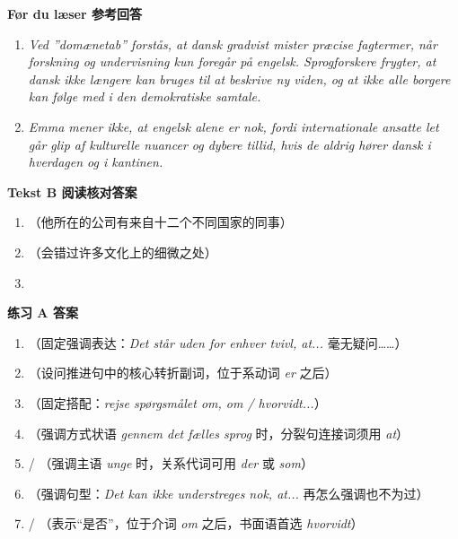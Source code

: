 \begin{answerbox}
\textbf{Før du læser 参考回答}
\begin{enumerate}
  \item \textit{Ved ”domænetab” forstås, at dansk gradvist mister præcise fagtermer, når forskning og undervisning kun foregår på engelsk. Sprogforskere frygter, at dansk ikke længere kan bruges til at beskrive ny viden, og at ikke alle borgere kan følge med i den demokratiske samtale.}
  \item \textit{Emma mener ikke, at engelsk alene er nok, fordi internationale ansatte let går glip af kulturelle nuancer og dybere tillid, hvis de aldrig hører dansk i hverdagen og i kantinen.}
\end{enumerate}

\textbf{Tekst B 阅读核对答案}
\begin{enumerate}
  \item {}（他所在的公司有来自十二个不同国家的同事）
  \item {}（会错过许多文化上的细微之处）
  \item {}
\end{enumerate}

\textbf{练习 A 答案}
\begin{enumerate}
  \item {}（固定强调表达：\textit{Det står uden for enhver tvivl, at...} 毫无疑问……）
  \item {}（设问推进句中的核心转折副词，位于系动词 \textit{er} 之后）
  \item {}（固定搭配：\textit{rejse spørgsmålet om, om / hvorvidt...}）
  \item {}（强调方式状语 \textit{gennem det fælles sprog} 时，分裂句连接词须用 \textit{at}）
  \item {} / （强调主语 \textit{unge} 时，关系代词可用 \textit{der} 或 \textit{som}）
  \item {}（强调句型：\textit{Det kan ikke understreges nok, at...} 再怎么强调也不为过）
  \item {} / （表示“是否”，位于介词 \textit{om} 之后，书面语首选 \textit{hvorvidt}）
\end{enumerate}


\end{answerbox}
